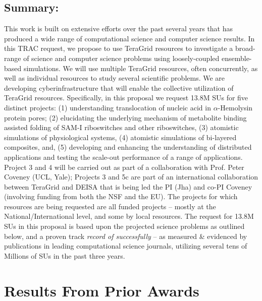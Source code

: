 \documentclass[a4paper,10pt]{article}
\newcommand{\up}{\vspace*{-1em}}
\begin{document}
\subsection*{Summary:} 
This work is built on extensive efforts over the past several years that has produced a wide range of computational science and computer science results. In this TRAC request, we propose to use TeraGrid resources to investigate a broad-range of science and computer science problems using loosely-coupled ensemble-based simulations.  We will use multiple TeraGrid resources, often concurrently, as well as individual resources to study several scientific problems. We are developing cyberinfrastructure that will enable the collective utilization of TeraGrid resources.  Specifically, in this proposal we request 13.8M SUs for five distinct projects: (1) understanding translocation of nucleic acid in $\alpha$-Hemolysin protein pores; (2) elucidating the underlying mechanism of metabolite binding assisted folding of SAM-I riboswitches and other riboswitches, (3) atomistic simulations of physiological systems, (4) atomistic simulations of bi-layered composites, and, (5) developing and enhancing the understanding of distributed applications and testing the scale-out performance of a range of applications.  Project 3 and 4 will be carried out as part of a collaboration with Prof. Peter Coveney (UCL, Yale); Projects 3 and 5c are part of an international collaboration between TeraGrid and DEISA that is being led the PI (Jha) and co-PI Coveney (involving funding from both the NSF and the EU). The projects for which resources are being requested are all funded projects -- mostly at the National/International level, and some by local resources.  The request for 13.8M SUs in this proposal is based upon the projected science problems as outlined below, and a proven track {\it record of successfully} -- as measured \& evidenced by publications in leading computational science journals, utilizing several tens of Millions of SUs in the past three years.

\up\up
\section{Results From Prior Awards}
\up


\end{document}
